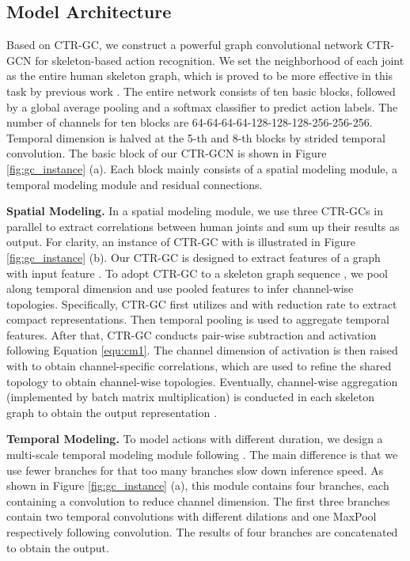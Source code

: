 \documentclass[10pt,twocolumn,letterpaper]{article}
\begin{document}
\subsection{Model Architecture}
\label{sec:model_architecture}
Based on CTR-GC, we construct a powerful graph convolutional network CTR-GCN for skeleton-based action recognition. We set the neighborhood of each joint as the entire human skeleton graph, which is proved to be more effective in this task by previous work \cite{cheng2020skeleton,shi2019two}. The entire network consists of ten basic blocks, followed by a global average pooling and a softmax classifier to predict action labels. The number of channels for ten blocks are 64-64-64-64-128-128-128-256-256-256. Temporal dimension is halved at the 5-th and 8-th blocks by strided temporal convolution. The basic block of our CTR-GCN is shown in Figure \ref{fig:gc_instance} (a). Each block mainly consists of a spatial modeling module, a temporal modeling module and residual connections. 

\noindent \textbf{Spatial Modeling.} In a spatial modeling module, we use three CTR-GCs in parallel to extract correlations between human joints and sum up their results as output. For clarity, an instance of CTR-GC with  is illustrated in Figure \ref{fig:gc_instance} (b). Our CTR-GC is designed to extract features of a graph with input feature . To adopt CTR-GC to a skeleton graph sequence , we pool  along temporal dimension and use pooled features to infer channel-wise topologies. Specifically, CTR-GC first utilizes  and  with reduction rate  to extract compact representations. Then temporal pooling is used to aggregate temporal features. After that, CTR-GC conducts pair-wise subtraction and activation following Equation \ref{equ:cm1}. The channel dimension of activation is then raised with  to obtain channel-specific correlations, which are used to refine the shared topology  to obtain channel-wise topologies. Eventually, channel-wise aggregation (implemented by batch matrix multiplication) is conducted in each skeleton graph to obtain the output representation .

\noindent \textbf{Temporal Modeling.} To model actions with different duration, we design a multi-scale temporal modeling module following \cite{liu2020disentangling}. The main difference is that we use fewer branches for that too many branches slow down inference speed. As shown in Figure \ref{fig:gc_instance} (a), this module contains four branches, each containing a  convolution to reduce channel dimension. The first three branches contain two temporal convolutions with different dilations and one MaxPool respectively following  convolution. The results of four branches are concatenated to obtain the output.
\end{document}
